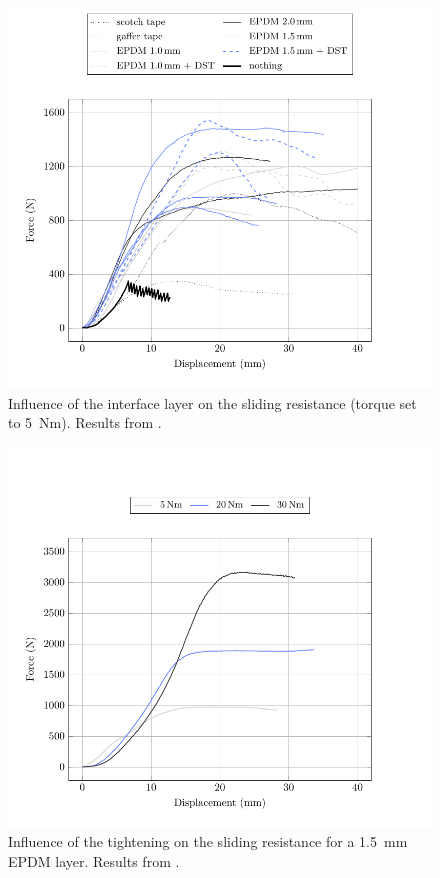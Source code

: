\begin{figure}[p]
\centering
\begin{fullpage}
	\includegraphics[]{ch3_creteil/plot/1_layer_benchmark/build.pdf}
	\caption[Influence of the interface layer on the sliding resistance]{Influence of the interface layer on the sliding resistance (torque set to \SI{5}{Nm}). Results from \cite{Tayeb2015a}.}
	\label{plot:layer_benchmark}
\end{fullpage}
\end{figure}

\begin{figure}[p]
\centering
\begin{fullpage}
	\includegraphics[]{ch3_creteil/plot/3_tightening/build.pdf}
	\caption[Influence of the tightening on the sliding resistance]{Influence of the tightening on the sliding resistance for a \SI{1.5}{\mm} EPDM layer. Results from \cite{Tayeb2015a}.}
	\label{plot:tightening}
\end{fullpage}
\end{figure}

